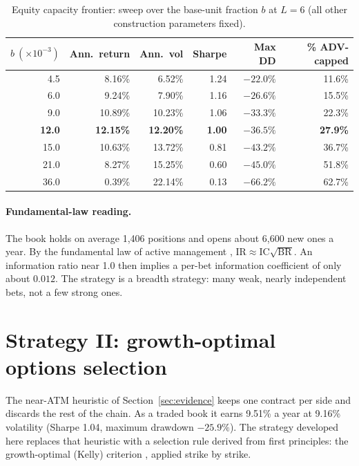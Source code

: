 \documentclass[11pt]{article}
\theoremstyle{definition}
\newcommand{\1}{\mathbf{1}}
\begin{document}
\begin{table}[t]\centering\small
\caption{Equity capacity frontier: sweep over the base-unit fraction $b$ at $L=6$ (all
other construction parameters fixed).}\label{tab:frontier}
\begin{tabular}{rrrrrr}
\toprule
$b\ (\times10^{-3})$ & Ann.\ return & Ann.\ vol & Sharpe & Max DD & \% ADV-capped\\
\midrule
4.5 & 8.16\% & 6.52\% & 1.24 & $-22.0\%$ & 11.6\%\\
6.0 & 9.24\% & 7.90\% & 1.16 & $-26.6\%$ & 15.5\%\\
9.0 & 10.89\% & 10.23\% & 1.06 & $-33.3\%$ & 22.3\%\\
\textbf{12.0} & \textbf{12.15\%} & \textbf{12.20\%} & \textbf{1.00} & $\mathbf{-36.5\%}$ & \textbf{27.9\%}\\
15.0 & 10.63\% & 13.72\% & 0.81 & $-43.2\%$ & 36.7\%\\
21.0 & 8.27\% & 15.25\% & 0.60 & $-45.0\%$ & 51.8\%\\
36.0 & 0.39\% & 22.14\% & 0.13 & $-66.2\%$ & 62.7\%\\
\bottomrule
\end{tabular}
\end{table}

\paragraph{Fundamental-law reading.} The book holds on average 1{,}406 positions and opens
about 6{,}600 new ones a year. By the fundamental law of active management
\citep{Grinold1989}, $\mathrm{IR}\approx\mathrm{IC}\sqrt{\mathrm{BR}}$. An information
ratio near 1.0 then implies a per-bet information coefficient of only about $0.012$. The
strategy is a breadth strategy: many weak, nearly independent bets, not a few strong
ones.

\section{Strategy II: growth-optimal options selection}\label{sec:options}

The near-ATM heuristic of Section~\ref{sec:evidence} keeps one contract per side and
discards the rest of the chain. As a traded book it earns 9.51\% a year at 9.16\%
volatility (Sharpe 1.04, maximum drawdown $-25.9\%$). The strategy developed here replaces
that heuristic with a selection rule derived from first principles: the growth-optimal (Kelly) criterion \citep{Kelly1956,MacLeanThorpZiemba2011}, applied strike by strike.
\end{document}
